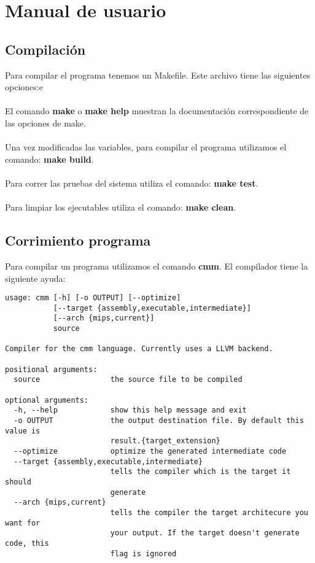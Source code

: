 \documentclass[11pt]{article}
\begin{document}
\pagebreak

\section{Manual de usuario}

\subsection{Compilación}

Para compilar el programa tenemos un Makefile. Este archivo tiene las siguientes opciones:e
\\\\
El comando \textbf{make} o \textbf{make help} muestran la documentación correspondiente de las opciones de make.
\\\\
Una vez modificadas las variables, para compilar el programa utilizamos el comando: \textbf{make build}.
\\\\
Para correr las pruebas del sistema utiliza el comando: \textbf{make test}.
\\\\
Para limpiar los ejecutables utiliza el comando: \textbf{make clean}.

\subsection{Corrimiento programa}

Para compilar un programa utilizamos el comando \textbf{cmm}. El compilador tiene la siguiente ayuda:
 
\begin{verbatim}
usage: cmm [-h] [-o OUTPUT] [--optimize]
           [--target {assembly,executable,intermediate}]
           [--arch {mips,current}]
           source

Compiler for the cmm language. Currently uses a LLVM backend.

positional arguments:
  source                the source file to be compiled

optional arguments:
  -h, --help            show this help message and exit
  -o OUTPUT             the output destination file. By default this value is
                        result.{target_extension}
  --optimize            optimize the generated intermediate code
  --target {assembly,executable,intermediate}
                        tells the compiler which is the target it should
                        generate
  --arch {mips,current}
                        tells the compiler the target architecure you want for
                        your output. If the target doesn't generate code, this
                        flag is ignored
\end{verbatim}
\end{document}
